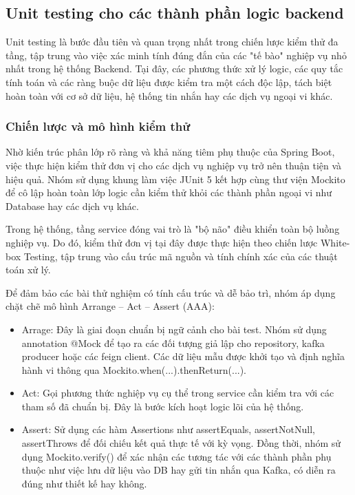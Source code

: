 \subsection{Unit testing cho các thành phần logic backend}

Unit testing là bước đầu tiên và quan trọng nhất trong chiến lược kiểm thử đa tầng, tập trung vào việc xác minh tính đúng đắn của các "tế bào" nghiệp vụ nhỏ nhất trong hệ thống Backend. Tại đây, các phương thức xử lý logic, các quy tắc tính toán và các ràng buộc dữ liệu được kiểm tra một cách độc lập, tách biệt hoàn toàn với cơ sở dữ liệu, hệ thống tin nhắn hay các dịch vụ ngoại vi khác.

\subsubsection{Chiến lược và mô hình kiểm thử}

Nhờ kiến trúc phân lớp rõ ràng và khả năng tiêm phụ thuộc của Spring Boot, việc thực hiện kiểm thử đơn vị cho các dịch vụ nghiệp vụ trở nên thuận tiện và hiệu quả. Nhóm sử dụng khung làm việc JUnit 5 kết hợp cùng thư viện Mockito để cô lập hoàn toàn lớp logic cần kiểm thử khỏi các thành phần ngoại vi như Database hay các dịch vụ khác.

Trong hệ thống, tầng service đóng vai trò là "bộ não" điều khiển toàn bộ luồng nghiệp vụ. Do đó, kiểm thử đơn vị tại đây được thực hiện theo chiến lược White-box Testing, tập trung vào cấu trúc mã nguồn và tính chính xác của các thuật toán xử lý.

Để đảm bảo các bài thử nghiệm có tính cấu trúc và dễ bảo trì, nhóm áp dụng chặt chẽ mô hình Arrange – Act – Assert (AAA):

\begin{itemize}
    \item Arrage: Đây là giai đoạn chuẩn bị ngữ cảnh cho bài test. Nhóm sử dụng annotation @Mock để tạo ra các đối tượng giả lập cho repository, kafka producer hoặc các feign client. Các dữ liệu mẫu được khởi tạo và định nghĩa hành vi thông qua Mockito.when(...).thenReturn(...).
    \item Act: Gọi phương thức nghiệp vụ cụ thể trong service cần kiểm tra với các tham số đã chuẩn bị. Đây là bước kích hoạt logic lõi của hệ thống.
    \item Assert: Sử dụng các hàm Assertions như assertEquals, assertNotNull, assertThrows để đối chiếu kết quả thực tế với kỳ vọng. Đồng thời, nhóm sử dụng Mockito.verify() để xác nhận các tương tác với các thành phần phụ thuộc như việc lưu dữ liệu vào DB hay gửi tin nhắn qua Kafka, có diễn ra đúng như thiết kế hay không.
\end{itemize}

